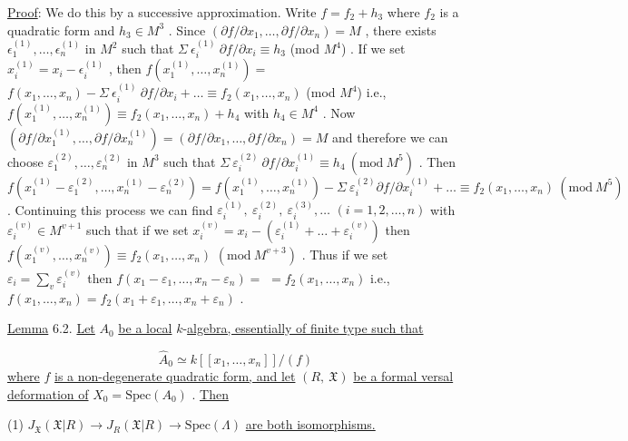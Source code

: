 \underline{Proof}:  We do this by a successive approximation. Write  $f = f_2 + h_3$  where  $f_2$ is a quadratic form and  $h_3 \in M^3$  . Since  $(\partial f/\partial x_1,\ldots,\partial f/\partial x_n) = M$  , there exists $\epsilon_1^{(1)},\ldots,\epsilon_n^{(1)}$  in  $M^2$  such that  $\Sigma\ \epsilon_i^{(1)}\ \partial f/\partial x_i \equiv h_3$  (mod $M^4$)  . If we set $x_i^{(1)} = x_i - \epsilon_i^{(1)}$  , then  $f(x_1^{(1)},\ldots,x_n^{(1)}) =$ $f(x_1,\ldots,x_n) - \Sigma\ \epsilon_i^{(1)}\ \partial f/\partial x_i + \ldots \equiv f_2(x_1,\ldots,x_n)$  (mod $M^4$)  i.e., $f(x_1^{(1)},\ldots,x_n^{(1)}) \equiv f_2(x_1,\ldots,x_n) + h_4$  with  $h_4 \in M^4$  . Now $(\partial f/\partial x_1^{(1)},\ldots,\partial f/\partial x_n^{(1)}) = (\partial f/\partial x_1,\ldots,\partial f/\partial x_n) = M$  and therefore we can choose
$\varepsilon_1^{(2)},\dots,\varepsilon_n^{(2)}$  in  $M^3$  such that  $\Sigma\ \varepsilon_i^{(2)}\ \partial f/\partial x_i^{(1)} \equiv h_4\ (\mathrm{mod}\ M^5)$ . Then $f(x_1^{(1)} - \varepsilon_1^{(2)},\dots,x_n^{(1)} - \varepsilon_n^{(2)}) = f(x_1^{(1)},\dots,x_n^{(1)}) - \Sigma\ \varepsilon_i^{(2)}\partial f/\partial x_i^{(1)} + \dots \equiv f_2(x_1,\dots,x_n)\ (\mathrm{mod}\ M^5)$ . Continuing this process we can find $\varepsilon_i^{(1)},\ \varepsilon_i^{(2)},\ \varepsilon_i^{(3)},\dots$  $(i = 1,2,\dots,n)$  with  $\varepsilon_i^{(v)} \in M^{v+1}$  such that if we set $x_i^{(v)} = x_i - (\varepsilon_i^{(1)} + \dots + \varepsilon_i^{(v)})$  then  $f(x_1^{(v)},\dots,x_n^{(v)}) \equiv f_2(x_1,\dots,x_n)$ $(\mathrm{mod}\ M^{v+3})$ . Thus if we set  $\varepsilon_i = \sum_{v} \varepsilon_i^{(v)}$  then  $f(x_1-\varepsilon_1,\dots,x_n-\varepsilon_n) =$ $= f_2(x_1,\dots,x_n)$  i.e.,  $f(x_1,\dots,x_n) = f_2(x_1+\varepsilon_1,\dots,x_n+\varepsilon_n)$ .

\underline{Lemma} 6.2.   \underline{Let}  $A_0$  \underline{be a local} $k$-\underline{algebra, essentially of finite type such that}

\begin{equation*}
\hat{A}_0 \simeq k[[x_1,\dots,x_n]]/(f)
\end{equation*}
\underline{where}  $f$  \underline{is a non-degenerate quadratic form, and let}  $(R,\ \mathfrak{X})$  \underline{be a formal versal deformation of}  $X_0 = \mathrm{Spec}(A_0)$  . \underline{Then}

(1)  $J_{\mathfrak{X}}(\mathfrak{X}|R) \rightarrow J_R(\mathfrak{X}|R) \rightarrow \mathrm{Spec}(\Lambda)$  \underline{are both isomorphisms.}


